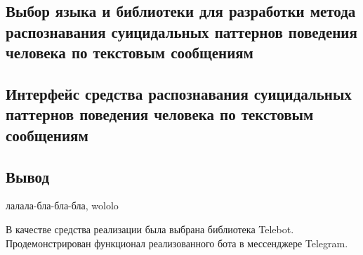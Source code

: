 \subsection{Выбор языка и библиотеки для разработки метода распознавания суицидальных паттернов поведения человека по текстовым сообщениям}

\subsection{Интерфейс средства распознавания суицидальных паттернов поведения человека по текстовым сообщениям}

\subsection*{Вывод}

лалала-бла-бла-бла, wololo

В качестве средства реализации была выбрана библиотека Telebot. Продемонстрирован функционал реализованного бота в мессенджере Telegram.
